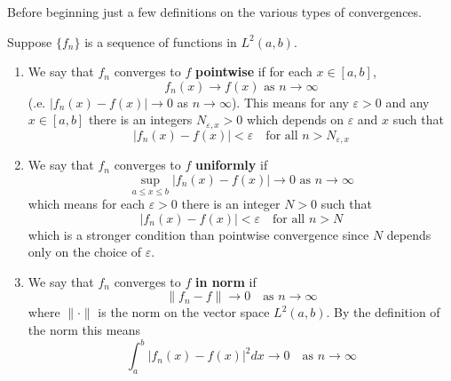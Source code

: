 
Before beginning just a few definitions on the various types
of convergences.

\begin{defn}
Suppose $\{f_n\}$ is a sequence of functions in $L^2(a,b)$.
\begin{enumerate}
\item We say that $f_n$ converges to $f$ \textbf{pointwise}
if for each $x\in[a,b]$,
\begin{equation}
f_{n}(x)\to f(x)\text{ as }n\to\infty
\end{equation}
(.e. $|f_n(x)-f(x)|\to0$ as $n\to\infty$). This means for
any $\varepsilon>0$ and any $x\in[a,b]$ there is an integers
$N_{\varepsilon,x}>0$ which depends on $\varepsilon$ and $x$
such that
\begin{equation}
|f_{n}(x)-f(x)|<\varepsilon\quad\text{for all }n>N_{\varepsilon,x}
\end{equation}
\item We say that $f_n$ converges to $f$ \textbf{uniformly}
if
\begin{equation}
\sup_{a\leq x\leq b}|f_{n}(x)-f(x)|\to0\text{ as }n\to\infty
\end{equation}
which means for each $\varepsilon>0$ there is an integer
$N>0$ such that
\begin{equation}
|f_{n}(x)-f(x)|<\varepsilon\quad\text{for all }n>N
\end{equation}
which is a stronger condition than pointwise convergence
since $N$ depends only on the choice of $\varepsilon$.
\item We say that $f_{n}$ converges to $f$ \textbf{in norm}
if
\begin{equation}
\|f_n-f\|\to0\quad\text{as }n\to\infty
\end{equation}
where $\|\cdot\|$ is the norm on the vector space
$L^{2}(a,b)$. By the definition of the norm this means
\begin{equation}
\int^{b}_{a}|f_n(x)-f(x)|^2dx\to 0\quad\text{as }n\to\infty
\end{equation}
\end{enumerate}
\end{defn}

